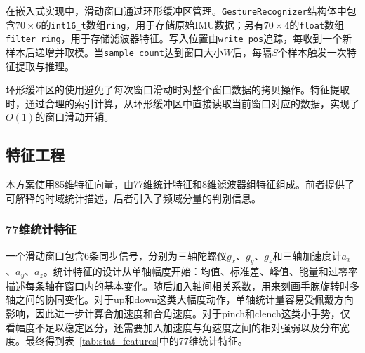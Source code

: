 \documentclass[lettersize,journal]{IEEEtran}
\begin{document}
在嵌入式实现中，滑动窗口通过环形缓冲区管理。\texttt{GestureRecognizer}结构体中包含$70 \times 6$的\texttt{int16\_t}数组\texttt{ring}，用于存储原始IMU数据；另有$70 \times 4$的\texttt{float}数组\texttt{filter\_ring}，用于存储滤波器特征。写入位置由\texttt{write\_pos}追踪，每收到一个新样本后递增并取模。当\texttt{sample\_count}达到窗口大小$W$后，每隔$S$个样本触发一次特征提取与推理。

环形缓冲区的使用避免了每次窗口滑动时对整个窗口数据的拷贝操作。特征提取时，通过合理的索引计算，从环形缓冲区中直接读取当前窗口对应的数据，实现了$O(1)$的窗口滑动开销。

\subsection{特征工程}

本方案使用85维特征向量，由77维统计特征和8维滤波器组特征组成。前者提供了可解释的时域统计描述，后者引入了频域分量的判别信息。

\subsubsection{77维统计特征}

一个滑动窗口包含6条同步信号，分别为三轴陀螺仪$g_x$、$g_y$、$g_z$和三轴加速度计$a_x$、$a_y$、$a_z$。统计特征的设计从单轴幅度开始：均值、标准差、峰值、能量和过零率描述每条轴在窗口内的基本变化。随后加入轴间相关系数，用来刻画手腕旋转时多轴之间的协同变化。对于up和down这类大幅度动作，单轴统计量容易受佩戴方向影响，因此进一步计算合加速度和合角速度。对于pinch和clench这类小手势，仅看幅度不足以稳定区分，还需要加入加速度与角速度之间的相对强弱以及分布宽度。最终得到表~\ref{tab:stat_features}中的77维统计特征。
\end{document}
